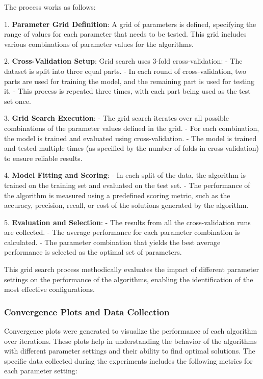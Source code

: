 \documentclass{article}
\begin{document}
    The process works as follows:

    1. \textbf{Parameter Grid Definition}: A grid of parameters is defined, specifying the range of values for each parameter that needs to be tested.
    This grid includes various combinations of parameter values for the algorithms.

    2. \textbf{Cross-Validation Setup}: Grid search uses 3-fold cross-validation:
    - The dataset is split into three equal parts.
    - In each round of cross-validation, two parts are used for training the model, and the remaining part is used for testing it.
    - This process is repeated three times, with each part being used as the test set once.

    3. \textbf{Grid Search Execution}:
    - The grid search iterates over all possible combinations of the parameter values defined in the grid.
    - For each combination, the model is trained and evaluated using cross-validation.
    - The model is trained and tested multiple times (as specified by the number of folds in cross-validation) to ensure reliable results.

    4. \textbf{Model Fitting and Scoring}:
    - In each split of the data, the algorithm is trained on the training set and evaluated on the test set.
    - The performance of the algorithm is measured using a predefined scoring metric, such as the accuracy, precision, recall, or cost of the solutions generated by the algorithm.

    5. \textbf{Evaluation and Selection}:
    - The results from all the cross-validation runs are collected.
    - The average performance for each parameter combination is calculated.
    - The parameter combination that yields the best average performance is selected as the optimal set of parameters.

    This grid search process methodically evaluates the impact of different parameter settings on the performance of the algorithms, enabling the identification of the most effective configurations.

    \subsubsection{Convergence Plots and Data Collection}

    Convergence plots were generated to visualize the performance of each algorithm over iterations. These plots help in understanding the behavior of the algorithms with different parameter settings and their ability to find optimal solutions. The specific data collected during the experiments includes the following metrics for each parameter setting:
\end{document}
